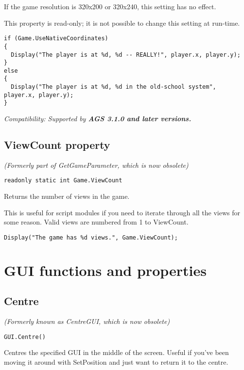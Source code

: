 If the game resolution is 320x200 or 320x240, this setting has no effect.

This property is read-only; it is not possible to change this setting at run-time.

\begin{verbatim}
if (Game.UseNativeCoordinates)
{
  Display("The player is at %d, %d -- REALLY!", player.x, player.y);
}
else
{
  Display("The player is at %d, %d in the old-school system", player.x, player.y);
}
\end{verbatim}

\it{Compatibility:} Supported by \bf{AGS 3.1.0} and later versions.


\subsection{ViewCount property}\label{Game.ViewCount}%

\it{(Formerly part of GetGameParameter, which is now obsolete)}

\begin{verbatim}
readonly static int Game.ViewCount
\end{verbatim}
Returns the number of views in the game.

This is useful for script modules if you need to iterate through all the views for some reason.
Valid views are numbered from 1 to ViewCount.

\begin{verbatim}
Display("The game has %d views.", Game.ViewCount);
\end{verbatim}



\section{GUI functions and properties}\label{GUIFuncsAndProps}%



\subsection{Centre}\label{GUI.Centre}%

\it{(Formerly known as CentreGUI, which is now obsolete)}

\begin{verbatim}
GUI.Centre()
\end{verbatim}
Centres the specified GUI in the middle of the screen. Useful if you've been moving
it around with SetPosition and just want to return it to the centre.

